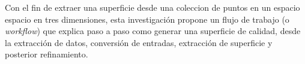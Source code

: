 Con el fin de extraer una superficie desde una coleccion de puntos en un espacio espacio en tres dimensiones, esta investigación propone un flujo de trabajo (o \emph{workflow}) que explica paso a paso como generar una superficie de calidad, desde la extracción de datos, conversión de entradas, extracción de superficie y posterior refinamiento.